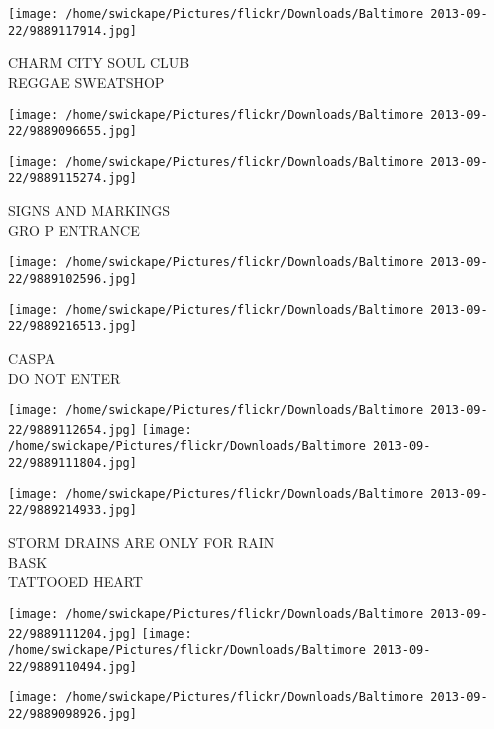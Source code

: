 \documentclass[10pt,letterpaper]{article}
\begin{document}
\vspace{0.25in}
\texttt{[image: /home/swickape/Pictures/flickr/Downloads/Baltimore 2013-09-22/9889117914.jpg]}

CHARM CITY SOUL CLUB\\
REGGAE SWEATSHOP\\
\pagebreak

\texttt{[image: /home/swickape/Pictures/flickr/Downloads/Baltimore 2013-09-22/9889096655.jpg]}

\vspace{0.25in}
\texttt{[image: /home/swickape/Pictures/flickr/Downloads/Baltimore 2013-09-22/9889115274.jpg]}

SIGNS AND MARKINGS\\
GRO P ENTRANCE\\
\pagebreak

\texttt{[image: /home/swickape/Pictures/flickr/Downloads/Baltimore 2013-09-22/9889102596.jpg]}

\vspace{0.25in}
\texttt{[image: /home/swickape/Pictures/flickr/Downloads/Baltimore 2013-09-22/9889216513.jpg]}

CASPA\\
DO NOT ENTER\\
\pagebreak

\texttt{[image: /home/swickape/Pictures/flickr/Downloads/Baltimore 2013-09-22/9889112654.jpg]}
\texttt{[image: /home/swickape/Pictures/flickr/Downloads/Baltimore 2013-09-22/9889111804.jpg]}

\vspace{0.25in}
\texttt{[image: /home/swickape/Pictures/flickr/Downloads/Baltimore 2013-09-22/9889214933.jpg]}

STORM DRAINS ARE ONLY FOR RAIN\\
BASK\\
TATTOOED HEART\\
\pagebreak

\texttt{[image: /home/swickape/Pictures/flickr/Downloads/Baltimore 2013-09-22/9889111204.jpg]}
\texttt{[image: /home/swickape/Pictures/flickr/Downloads/Baltimore 2013-09-22/9889110494.jpg]}

\vspace{0.25in}
\texttt{[image: /home/swickape/Pictures/flickr/Downloads/Baltimore 2013-09-22/9889098926.jpg]}
\end{document}
